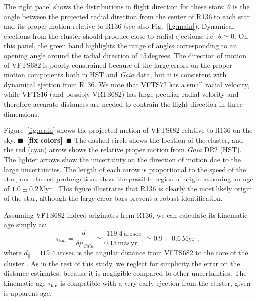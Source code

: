 \documentclass[apjl,twocolumn]{emulateapj}
\newcommand{\todo}[1]{{\large $\blacksquare$~\textbf{\color{red}[#1]}}~$\blacksquare$}
\newcommand{\masyr}{\,\mathrm{mas}\,\mathrm{yr}^{-1}}
\DeclareRobustCommand{\Figref}[1]{Fig.~\ref{#1}}
\begin{document}
The right panel shows the distributions in flight direction for these
stars: $\theta$ is the angle between the projected radial direction from the
center of R136 to each star and its proper motion relative to
R136 (see also \Figref{fig:main}). Dynamical ejections from the
cluster should %
produce
close to radial ejections, i.e.~$\theta\simeq0$. On this panel, the green band highlights
the range of angles corresponding to an opening angle around the
radial direction of 45\,degrees. The direction of motion of VFTS682 is
poorly constrained because of the large errors on the proper motion
components both in HST and \emph{Gaia} data, but
it is consistent with dynamical ejection from R136. We note that
VFTS72 has a small radial velocity, while VFTS16 (and possibly VRTS682) has
large peculiar radial velocity and therefore accurate distances are
needed to contrain the flight direction in three dimensions.

Figure~\ref{fig:main} shows the projected motion of VFTS682 relative to R136 on the
sky. \todo{fix colors} The dashed circle shows the location of the cluster, and the red
(cyan) arrow shows the relative proper motion from \emph{Gaia} DR2
(HST). The lighter arrows show the uncertainty on the direction of
motion due to the large uncertainties. The length of each arrow is proportional to
the speed of the star, and dashed prolungations show the possible
region of origin assuming an age of $1.0\pm0.2$\,Myr
\citep[][]{schneider:18}. This figure illustrates that R136 is clearly
the most likely origin of the star, although the large error bars
prevent a robust identification. 

Assuming VFTS682 indeed originates from R136, we can calculate its kinematic
age simply as:
\begin{equation}
  \label{eq:kin_age}
  \tau_\mathrm{kin} = \frac{d_\parallel}{\delta\mu_{Gaia}} \simeq
  \frac{119.4\,\mathrm{arcsec}}{0.13\masyr} \simeq 0.9\pm\,0.6\, \mathrm{Myr} \ \ ,
\end{equation}
where $d_\parallel = 119.4\,\mathrm{arcsec}$ is the angular distance from VFTS682 to
the core of the cluster \citep[corresponding to $\sim$29\,pc at LMC distance,][]{bestenlehner:11}.
As in the rest of this study, we neglect for
simplicity the error on the distance estimates, because it is negligible compared to other uncertainties.
The kinematic age $\tau_\mathrm{kin}$ is compatible with a very early
ejection from the cluster, given is apparent age.
\end{document}
